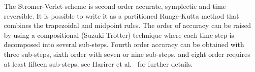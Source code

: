 \documentclass[11pt]{article}
\begin{document}
The Stromer-Verlet scheme is second order accurate, symplectic and time reversible. It is possible
to write it as a partitioned Runge-Kutta method that combines the trapezoidal and midpoint
rules. The order of accuracy can be raised by using a compositional (Suzuki-Trotter) technique where
each time-step is decomposed into several sub-steps. Fourth order accuracy can be obtained with
three sub-steps, sixth order with seven or nine sub-steps, and eight order requires at least fifteen
sub-steps, see Harirer et al.~\cite{HairerLubichWanner-06} for further details.



\end{document}
